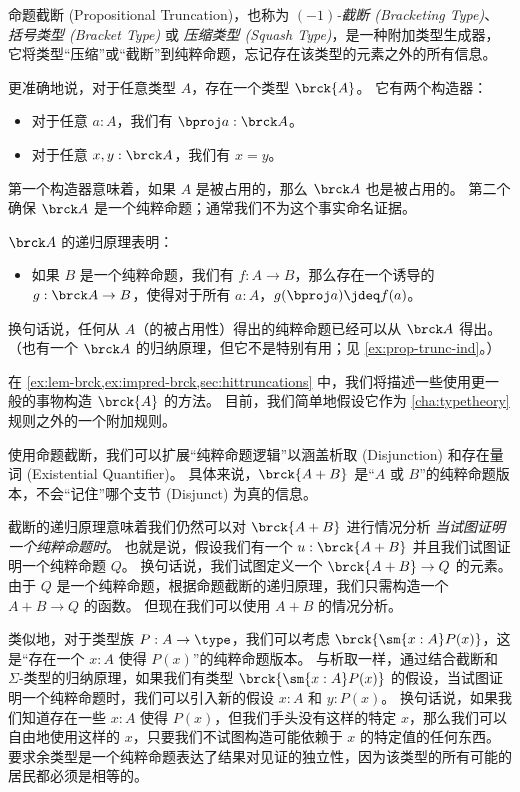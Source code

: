 %
%
%
%
%
命题截断 (Propositional Truncation)，也称为 \emph{$(-1)$-截断 (Bracketing Type)}、\emph{括号类型 (Bracket Type)} 或 \emph{压缩类型 (Squash Type)}，是一种附加类型生成器，它将类型“压缩”或“截断”到纯粹命题，忘记存在该类型的元素之外的所有信息。

更准确地说，对于任意类型 $A$，存在一个类型 $\brck{A}$。
它有两个构造器：
\begin{itemize}
  \item 对于任意 $a:A$，我们有 $\bproj a : \brck A$。
  \item 对于任意 $x,y:\brck A$，我们有 $x=y$。
\end{itemize}
第一个构造器意味着，如果 $A$ 是被占用的，那么 $\brck A$ 也是被占用的。
第二个确保 $\brck A$ 是一个纯粹命题；通常我们不为这个事实命名证据。

%
$\brck A$ 的递归原理表明：
\begin{itemize}
  \item 如果 $B$ 是一个纯粹命题，我们有 $f:A\to B$，那么存在一个诱导的 $g:\brck A \to B$，使得对于所有 $a:A$，$g(\bproj a) \jdeq f(a)$。
\end{itemize}
换句话说，任何从 $A$（的被占用性）得出的纯粹命题已经可以从 $\brck A$ 得出。
（也有一个 $\brck A$ 的归纳原理，但它不是特别有用；见 \cref{ex:prop-trunc-ind}。）

在 \cref{ex:lem-brck,ex:impred-brck,sec:hittruncations} 中，我们将描述一些使用更一般的事物构造 $\brck{A}$ 的方法。
目前，我们简单地假设它作为 \cref{cha:typetheory} 规则之外的一个附加规则。

使用命题截断，我们可以扩展“纯粹命题逻辑”以涵盖析取 (Disjunction) 和存在量词 (Existential Quantifier)。
具体来说，$\brck{A+B}$ 是“$A$ 或 $B$”的纯粹命题版本，不会“记住”哪个支节 (Disjunct) 为真的信息。

截断的递归原理意味着我们仍然可以对 $\brck{A+B}$ 进行情况分析 \emph{当试图证明一个纯粹命题时}。
也就是说，假设我们有一个 $u:\brck{A+B}$ 并且我们试图证明一个纯粹命题 $Q$。
换句话说，我们试图定义一个 $\brck{A+B} \to Q$ 的元素。
由于 $Q$ 是一个纯粹命题，根据命题截断的递归原理，我们只需构造一个 $A+B\to Q$ 的函数。
但现在我们可以使用 $A+B$ 的情况分析。

类似地，对于类型族 $P:A\to\type$，我们可以考虑 $\brck{\sm{x:A} P(x)}$，这是“存在一个 $x:A$ 使得 $P(x)$”的纯粹命题版本。
与析取一样，通过结合截断和 $\Sigma$-类型的归纳原理，如果我们有类型 $\brck{\sm{x:A} P(x)}$ 的假设，当试图证明一个纯粹命题时，我们可以引入新的假设 $x:A$ 和 $y:P(x)$。
换句话说，如果我们知道存在一些 $x:A$ 使得 $P(x)$，但我们手头没有这样的特定 $x$，那么我们可以自由地使用这样的 $x$，只要我们不试图构造可能依赖于 $x$ 的特定值的任何东西。
要求余类型是一个纯粹命题表达了结果对见证的独立性，因为该类型的所有可能的居民都必须是相等的。

